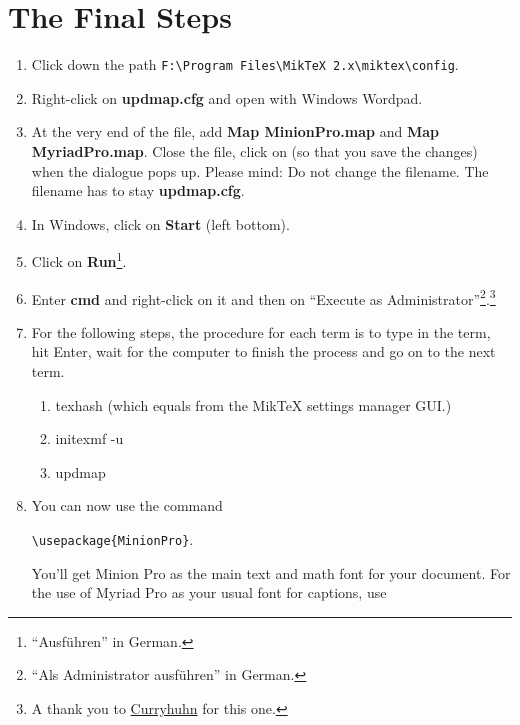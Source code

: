\section{The Final Steps}

\begin{enumerate}\setlength{\itemsep}{-2pt}
	\item Click down the path \verb+F:\Program Files\MikTeX 2.x\miktex\config+.
	\item Right-click on \textbf{updmap.cfg} and open with Windows Wordpad.
	\item At the very end of the file, add \textbf{Map MinionPro.map} and \textbf{Map MyriadPro.map}. Close the file, click on  (so that you save the changes) when the dialogue pops up. Please mind: Do not change the filename. The filename has to stay \textbf{updmap.cfg}.
	\item In Windows, click on \textbf{Start} (left bottom).
	\item Click on \textbf{Run}\footnote{``Ausführen'' in German.}.
	\item Enter \textbf{cmd} and right-click on it and then on ``Execute as Administrator''\footnote{``Als Administrator ausführen'' in German.}.\footnote{A  thank you to \href{http://www.typografie.info/3/topic/25089-schriftart-festlegen/\#entry132082}{Curryhuhn} for this one.}
	\item For the following steps, the procedure for each term is to type in the term, hit Enter, wait for the computer to finish the process and go on to the next term.
	\begin{enumerate}
		\item texhash (which equals  from the MikTeX settings manager GUI.)
		\item initexmf -u
		\item updmap
	\end{enumerate}
	\item You can now use the command
	\begin{center}\begin{minipage}[t]{8cm}
	\begin{flushleft}
	\verb+\usepackage{MinionPro}+.
	\end{flushleft}
	\end{minipage}\end{center}
	You'll get Minion Pro as the main text and math font for your document. For the use of Myriad Pro as your usual font for captions, use
	\begin{center}\begin{minipage}[t]{8cm}

\end{minipage}
\end{center}
\end{enumerate}

